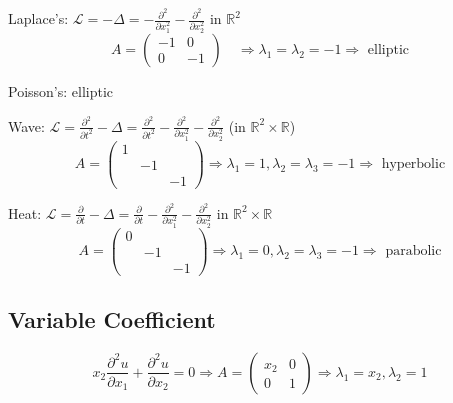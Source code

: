 \begin{example}

    Laplace's: $\mathcal{L} = -\Delta = -\frac{\partial^2}{\partial x_1^2} - \frac{\partial^2}{\partial x_2^2}$ in $\mathbb{R}^2$
    \[A = \begin{pmatrix} -1 & 0 \\ 0 & -1 \end{pmatrix} \quad \Rightarrow \lambda_1 = \lambda_2 = -1 \Rightarrow \text{ elliptic}\]

    Poisson's: elliptic

    Wave: $\mathcal{L} = \frac{\partial^2}{\partial t^2} - \Delta = \frac{\partial^2}{\partial t^2}- \frac{\partial^2}{\partial x_1^2} - \frac{\partial^2}{\partial x_2^2}$ (in $\mathbb{R}^2 \times \mathbb{R}$)
    \[A = \begin{pmatrix}
        1 & & \\ & -1 & \\ & & -1
    \end{pmatrix} \Rightarrow \lambda_1 = 1, \lambda_2 = \lambda_3 = -1 \Rightarrow \text{ hyperbolic}\]

    Heat: $\mathcal{L} = \frac{\partial}{\partial t} - \Delta = \frac{\partial}{\partial t} - \frac{\partial ^2}{\partial x_1^2} - \frac{\partial^2}{\partial x_2^2}$ in $\mathbb{R}^2 \times \mathbb{R} $
    \[A = \begin{pmatrix}
    0 & & \\ & -1 & \\ & & -1
    \end{pmatrix} \Rightarrow \lambda_1 = 0, \lambda_2 = \lambda_3 = -1 \Rightarrow \text{ parabolic}\]
\end{example}

\subsection{Variable Coefficient}
\[x_2 \frac{\partial ^2 u}{\partial x_1} + \frac{\partial ^2 u}{\partial x_2} = 0 \Rightarrow A = \begin{pmatrix}
    x_2 & 0 \\ 0 & 1
\end{pmatrix} \Rightarrow \lambda_1 = x_2, \lambda_2 = 1\]

\begin{center}
\end{center}


